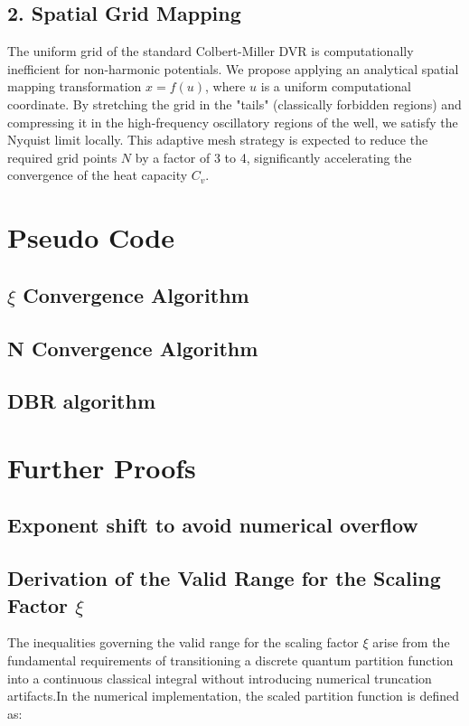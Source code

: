\documentclass{article}
\numberwithin{equation}{subsection}
\begin{document}
\subsection*{2. Spatial Grid Mapping}
The uniform grid of the standard Colbert-Miller DVR is computationally inefficient for non-harmonic potentials. We propose applying an analytical spatial mapping transformation $x = f(u)$, where $u$ is a uniform computational coordinate. By stretching the grid in the "tails" (classically forbidden regions) and compressing it in the high-frequency oscillatory regions of the well, we satisfy the Nyquist limit locally. This adaptive mesh strategy is expected to reduce the required grid points $N$ by a factor of 3 to 4, significantly accelerating the convergence of the heat capacity $C_v$.

\section{Pseudo Code}

\subsection{\texorpdfstring{$\xi$}{xi} Convergence Algorithm}

\subsection{N Convergence Algorithm}

\subsection{DBR algorithm}


\appendix
\section{Further Proofs}

\subsection{Exponent shift to avoid numerical overflow}

\subsection{Derivation of the Valid Range for the Scaling Factor \texorpdfstring{$\xi$}{xi}}The inequalities governing the valid range for the scaling factor $\xi$ arise from the fundamental requirements of transitioning a discrete quantum partition function into a continuous classical integral without introducing numerical truncation artifacts.In the numerical implementation, the scaled partition function is defined as:
\end{document}
